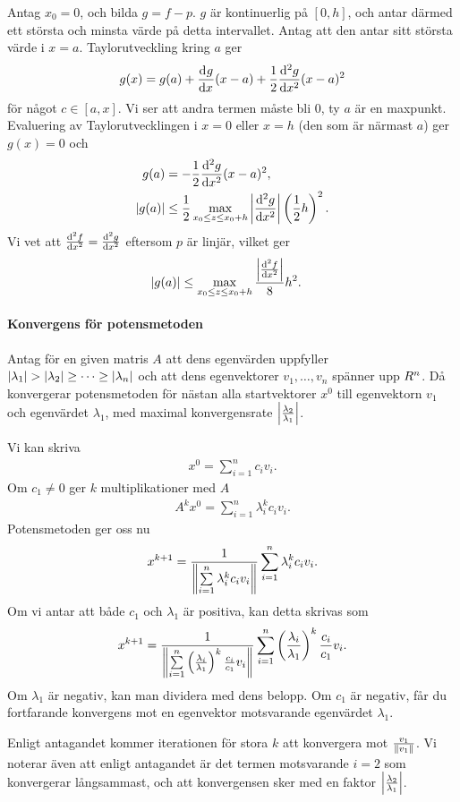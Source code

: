 \proof
Antag $x_{0} = 0$, och bilda $g = f - p$. $g$ är kontinuerlig på $[0, h]$, och antar därmed ett största och minsta värde på detta intervallet. Antag att den antar sitt största värde i $x = a$. Taylorutveckling kring $a$ ger
\begin{align*}
	g(x) = g(a) + \dv[]{g}{x} (a)(x - a) + \frac{1}{2}\dv[2]{g}{x} (c)(x - a)^{2}
\end{align*}
för något $c\in [a, x]$. Vi ser att andra termen måste bli $0$, ty $a$ är en maxpunkt. Evaluering av Taylorutvecklingen i $x = 0$ eller $x = h$ (den som är närmast $a$) ger $g(x) = 0$ och
\begin{align*}
	g(a)       &= -\frac{1}{2}\dv[2]{g}{x} (c)(x - a)^{2}, \\
	\abs{g(a)} &\leq \frac{1}{2}\max\limits_{x_{0} \leq z \leq x_{0} + h}\abs{\dv[2]{g}{x} (z)}\left(\frac{1}{2}h\right)^{2}.
\end{align*}
Vi vet att $\dv[2]{f}{x} (x) = \dv[2]{g}{x} (x)$ eftersom $p$ är linjär, vilket ger
\begin{align*}
	\abs{g(a)} &\leq \max\limits_{x_{0} \leq z \leq x_{0} + h}\frac{\abs{\dv[2]{f}{x} (z)}}{8}h^{2}.
\end{align*}

\paragraph{Konvergens för potensmetoden}
Antag för en given matris $A$ att dens egenvärden uppfyller $\abs{\lambda_{1}} > \abs{\lambda_{2}} \geq \dots \geq \abs{\lambda_{n}}$ och att dens egenvektorer $v_{1}, \dots, v_{n}$ spänner upp $R^{n}$. Då konvergerar potensmetoden för nästan alla startvektorer $x^{0}$ till egenvektorn $v_{1}$ och egenvärdet $\lambda_{1}$, med maximal konvergensrate $\abs{\frac{\lambda_{2}}{\lambda_{1}}}$.

\proof
Vi kan skriva
\begin{align*}
	x^{0} = \sum\limits_{i = 1}^{n}c_{i}v_{i}.
\end{align*}
Om $c_{1} \neq 0$ ger $k$ multiplikationer med $A$
\begin{align*}
	A^{k}x^{0} = \sum\limits_{i = 1}^{n}\lambda_{i}^{k}c_{i}v_{i}.
\end{align*}
Potensmetoden ger oss nu
\begin{align*}
	x^{k + 1} = \frac{1}{\norm{\sum\limits_{i = 1}^{n}\lambda_{i}^{k}c_{i}v_{i}}}\sum\limits_{i = 1}^{n}\lambda_{i}^{k}c_{i}v_{i}.
\end{align*}
Om vi antar att både $c_{1}$ och $\lambda_{1}$ är positiva, kan detta skrivas som
\begin{align*}
	x^{k + 1} = \frac{1}{\norm{\sum\limits_{i = 1}^{n}\left(\frac{\lambda_{i}}{\lambda_{1}}\right)^{k}\frac{c_{i}}{c_{1}}v_{i}}}\sum\limits_{i = 1}^{n}\left(\frac{\lambda_{i}}{\lambda_{1}}\right)^{k}\frac{c_{i}}{c_{1}}v_{i}.
\end{align*}
Om $\lambda_{1}$ är negativ, kan man dividera med dens belopp. Om $c_{1}$ är negativ, får du fortfarande konvergens mot en egenvektor motsvarande egenvärdet $\lambda_{1}$.

Enligt antagandet kommer iterationen för stora $k$ att konvergera mot $\frac{v_{1}}{\norm{v_{1}}}$. Vi noterar även att enligt antagandet är det termen motsvarande $i = 2$ som konvergerar långsammast, och att konvergensen sker med en faktor $\abs{\frac{\lambda_{2}}{\lambda_{1}}}$.